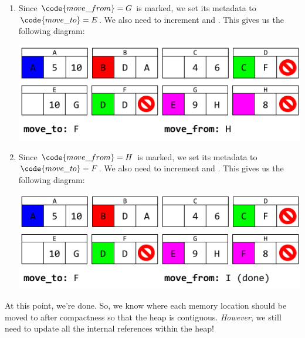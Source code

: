 \begin{enumerate}
    \item Since $\code{move\_from} = G$ is marked, we set its metadata to $\code{move\_to} = E$. We also need to increment  and . This gives us the following diagram: 
    \begin{center}
        \includegraphics[scale=0.6]{assets/GCAlg3_7.png}
    \end{center}

    \item Since $\code{move\_from} = H$ is marked, we set its metadata to $\code{move\_to} = F$. We also need to increment  and . This gives us the following diagram: 
    \begin{center}
        \includegraphics[scale=0.6]{assets/GCAlg3_8.png}
    \end{center}
\end{enumerate}
At this point, we're done. So, we know where each memory location should be moved to after compactness so that the heap is contiguous. \emph{However}, we still need to update all the internal references within the heap!

